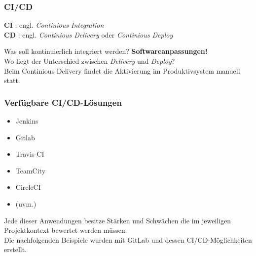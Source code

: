 \begin{frame}
\frametitle{CI/CD}

\begin{definition}
	\textbf{CI} : engl. \textit{Continious Integration}\\
	\textbf{CD} : engl. \textit{Continious Delivery} oder \textit{Continious Deploy} 
\end{definition}

\pause
Was soll kontinuierlich integriert werden?
\pause
\textbf{Softwareanpassungen!}\\
\pause 
Wo liegt der Unterschied zwischen \textit{Delivery} und \textit{Deploy}?\\
\pause
Beim Continious Delivery findet die Aktivierung im Produktivsystem manuell statt. 

\end{frame}

\begin{frame}
	\frametitle{Verfügbare CI/CD-Lösungen}
	\begin{itemize}
		\item Jenkins
		\item Gitlab 
		\item Travis-CI
		\item TeamCity
		\item CircleCI
		\item (uvm.)
	\end{itemize}
	Jede dieser Anwendungen besitze Stärken und Schwächen die im jeweiligen Projektkontext bewertet werden müssen. \\
	
	Die nachfolgenden Beispiele wurden mit GitLab und dessen CI/CD-Möglichkeiten erstellt.
\end{frame}